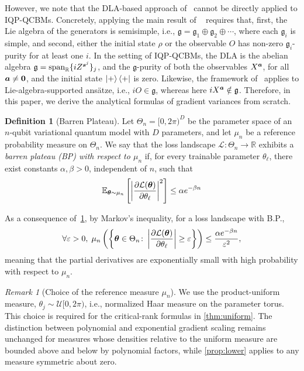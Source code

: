 \documentclass{article}
\theoremstyle{plain}
\theoremstyle{definition}
\newtheorem{definition}[theorem]{Definition}
\theoremstyle{remark}
\newtheorem{remark}[theorem]{Remark}
\begin{document}
However, we note that the DLA-based approach of~\citet{Ragone24} cannot be directly applied to IQP-QCBMs. Concretely, applying the main result of ~\citet{Ragone24} requires that, first, the Lie algebra of the generators is semisimple, i.e., $\mathfrak{g} = \mathfrak{g}_{1}\oplus \mathfrak{g}_{2}\oplus\cdots$, where each $\mathfrak{g}_i$ is simple, and second, either the initial state $\rho$ or the observable $O$ has non-zero $\mathfrak{g}_{i}$-purity for at least one $i$. In the setting of IQP-QCBMs, the DLA is the abelian algebra $\mathfrak{g}=\operatorname{span}_{\mathbb{R}}\{iZ^{{\bm{s}^j}}\}_j$, and the $\mathfrak{g}$-purity of both the observables $X^{{\bm{a}}}$, for all ${\bm{a}}\neq\bm 0$, and the initial state $\ket{+}\bra{+}$ is zero. Likewise, the framework of~\citet{fontana2024characterizing} applies to Lie-algebra-supported ansätze, i.e., $iO\in\mathfrak{g}$, whereas here $iX^{{\bm{a}}}\notin\mathfrak{g}$. Therefore, in this paper, we derive the analytical formulas of gradient variances from scratch.

\begin{definition}[Barren Plateau] \label{def:bp}
Let $\Theta_n=[0,2\pi)^D$ be the parameter space of an $n$-qubit variational quantum
model with $D$ parameters, and let $\mu_n$ be a reference probability measure on $\Theta_n$.
We say that the loss landscape $\mathcal L:\Theta_n \to \mathbb{R}$ exhibits a \emph{barren plateau (BP) with respect to $\mu_n$} if, for every trainable parameter $\theta_\ell$, there exist constants $\alpha,\beta>0$, independent of $n$, such that
$$
\mathbb E_{{\bm{\theta}}\sim\mu_n}
\left[
\left|
\frac{\partial \mathcal L({\bm{\theta}})}{\partial \theta_\ell}
\right|^2
\right]
\le \alpha e^{-\beta n} 
$$
\end{definition}
As a consequence of~\cref{def:bp}, by Markov's inequality, for a loss landscape with B.P., \begin{equation}
    \forall \varepsilon>0,\; \mu_n\left(\left\{ {\bm{\theta}}\in\Theta_n \colon \left| \frac{\partial \mathcal L({\bm{\theta}})}{\partial \theta_\ell} \right| \ge \varepsilon \right\} \right) \le \frac{\alpha e^{-\beta n}}{\varepsilon^2},
\end{equation}
meaning that the partial derivatives are exponentially small with high probability
with respect to $\mu_n$.

\begin{remark}[Choice of the reference measure $\mu_n$]
We use the product-uniform measure, $\theta_j\sim\mathcal U[0,2\pi)$, i.e., normalized Haar measure on the parameter torus. This choice is required for the critical-rank formulas in \cref{thm:uniform}. The distinction between polynomial and exponential gradient scaling remains unchanged for measures whose densities relative to the uniform measure are bounded above and below by polynomial factors, while \cref{prop:lower} applies to any measure symmetric about zero.
\end{remark}
\end{document}
